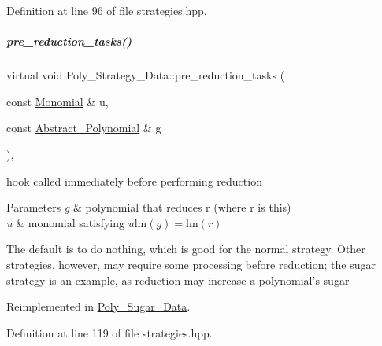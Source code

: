Definition at line 96 of file strategies.\+hpp.

\mbox{\label{group__strategygroup_a077b9fb020596f92ed0cb38fea2a0b71}} 
\subparagraph{\texorpdfstring{pre\+\_\+reduction\+\_\+tasks()}{pre\_reduction\_tasks()}\hspace{0.1cm}{\footnotesize\ttfamily [1/2]}}
{\footnotesize\ttfamily virtual void Poly\+\_\+\+Strategy\+\_\+\+Data\+::pre\+\_\+reduction\+\_\+tasks (\begin{DoxyParamCaption}\item[{const \hyperlink{group__polygroup_class_monomial}{Monomial} \&}]{u,  }\item[{const \hyperlink{group__polygroup_class_abstract___polynomial}{Abstract\+\_\+\+Polynomial} \&}]{g }\end{DoxyParamCaption})\hspace{0.3cm}{\ttfamily [inline]}, {\ttfamily [virtual]}}



hook called immediately before performing reduction 


\begin{DoxyParams}{Parameters}
{\em g} & polynomial that reduces {\ttfamily r} (where {\ttfamily r} is {\ttfamily this}) \\
\hline
{\em u} & monomial satisfying $u\textrm{lm}(g)=\textrm{lm}(r)$\\
\hline
\end{DoxyParams}
The default is to do nothing, which is good for the normal strategy. Other strategies, however, may require some processing before reduction; the sugar strategy is an example, as reduction may increase a polynomial's sugar 

Reimplemented in \hyperlink{group__strategygroup_a845d9c0d53954a50fe3112e94b1cdfa8}{Poly\+\_\+\+Sugar\+\_\+\+Data}.



Definition at line 119 of file strategies.\+hpp.

